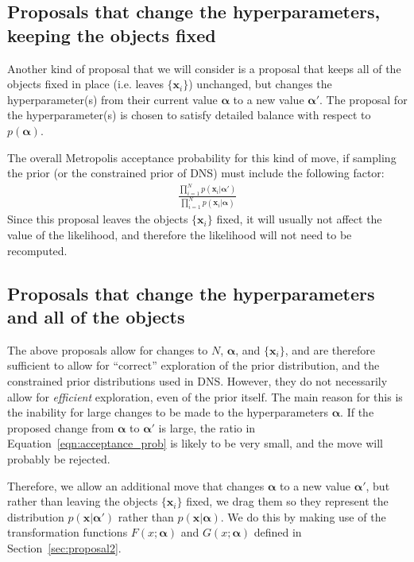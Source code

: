 \documentclass[letterpaper, 11pt]{article}
\newcommand{\hyperparams}{\boldsymbol{\alpha}}
\newcommand{\xx}{\mathbf{x}}
\begin{document}
\subsection{Proposals that change the hyperparameters,
keeping the objects fixed}\label{sec:proposal3}
Another kind of proposal that we will consider is a proposal that keeps all of
the objects fixed in place (i.e. leaves $\{\xx_i\}$) unchanged, but changes
the hyperparameter(s) from their current value $\hyperparams$
to a new value $\hyperparams'$. The proposal for the hyperparameter(s) is chosen
to satisfy detailed balance with respect to $p(\hyperparams)$.

The overall Metropolis acceptance probability
for this kind of move, if sampling the prior (or the constrained prior of DNS)
must include the following factor:
\begin{eqnarray}
\frac{\prod_{i=1}^N p(\xx_i | \hyperparams')}{\prod_{i=1}^N p(\xx_i | \hyperparams)}
\label{eqn:acceptance_prob}
\end{eqnarray}
Since this proposal leaves the objects $\{\xx_i\}$ fixed, it will usually not
affect the value of the likelihood, and therefore the likelihood will not need
to be recomputed.

\subsection{Proposals that change the hyperparameters
and all of the objects}\label{sec:proposal4}
The above proposals allow for changes to $N$, $\hyperparams$, and $\{\xx_i\}$,
and are therefore sufficient to allow for ``correct'' exploration of the
prior distribution, and the constrained prior distributions used in DNS.
However, they do not necessarily allow for {\it efficient} exploration, even
of the prior itself. The main reason for this is the inability for large
changes to be made to the hyperparameters $\hyperparams$. If the proposed change
from $\hyperparams$ to $\hyperparams'$ is large, the ratio in
Equation~\ref{eqn:acceptance_prob} is likely to be very small, and the move
will probably be rejected.

Therefore, we allow an additional move that changes $\hyperparams$ to a new
value $\hyperparams'$, but rather than leaving the objects $\{\xx_i\}$ fixed, we
drag them so they represent the distribution $p(\xx | \hyperparams')$ rather than
$p(\xx|\hyperparams)$. We do this by making use of the transformation functions
$F(x; \hyperparams)$ and $G(x; \hyperparams)$ defined in Section~\ref{sec:proposal2}.
\end{document}
